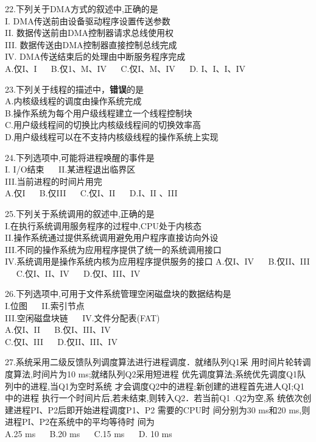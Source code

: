 22.下列关于DMA方式的叙述中,正确的是 \\
I. DMA传送前由设备驱动程序设置传送参数 \\
II. 数据传送前由DMA控制器请求总线使用权 \\
III. 数据传送由DMA控制器直接控制总线完成 \\
IV. DMA传送结束后的处理由中断服务程序完成 \\
A.仅I、I $\quad$ B.仅1、M、IV $\quad$ C.仅I、M、IV $\quad$ D. I、I、I、IV

23.下列关于线程的描述中，\textbf{错误}的是 \\
A.内核级线程的调度由操作系统完成 \\
B.操作系统为每个用户级线程建立一个线程控制块 \\
C.用户级线程间的切换比内核级线程间的切换效率高 \\
D.用户级线程可以在不支持内核级线程的操作系统上实现

24.下列选项中,可能将进程唤醒的事件是 \\
I. I/O结束 $\quad$ II.某进程退出临界区 \\
III.当前进程的时间片用完 \\
A.仅I $\quad$ B.仅III $\quad$ C.仅I、II $\quad$ D.I、II 、III

25.下列关于系统调用的叙述中,正确的是 \\
I.在执行系统调用服务程序的过程中,CPU处于内核态 \\
II.操作系统通过提供系统调用避免用户程序直接访向外设 \\
III.不同的操作系统为应用程序提供了统一的系统调用接口 \\
IV.系统调用是操作系统内核为应用程序提供服务的接口
A.仅I、IV $\quad$ B.仅II、III $\quad$ C.仅I、II、IV $\quad$ D.仅I、III、IV

26.下列选项中,可用于文件系统管理空闲磁盘块的数据结构是 \\
I.位图  $\quad$ II.索引节点 \\
III.空闲磁盘块链 $\quad$ IV.文件分配表(FAT) \\
A.仅I、II $\quad$ B.仅I、III、IV \\
C.仅I、III $\quad$ D.仅II、III、IV

27.系统采用二级反馈队列调度算法进行进程调度．就绪队列Q1采
用时间片轮转调度算法,时间片为10 ms;就绪队列Q2采用短进程
优先调度算法;系统优先调度Q1队列中的进程,当Q1为空时系统
才会调度Q2中的进程;新创建的进程首先进人QI;Q1中的进程
执行一个时间片后,若未结束,则转入Q2．若当前Q1 .Q2为空,系
统依次创建进程PI、P2后即开始进程调度P1、P2 需要的CPU时
间分别为30 ms和20 ms,则进程PI、P2在系统中的平均等待时
间为 \\
A.25 ms $\quad$ B.20 ms $\quad$ C.15 ms $\quad$ D. 10 ms

